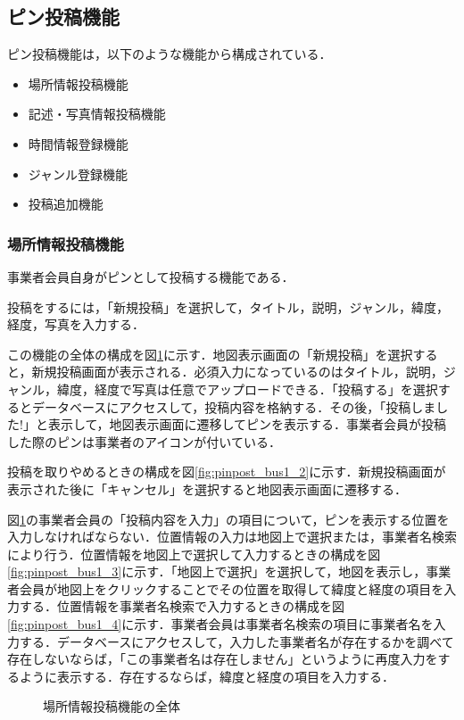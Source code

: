 \subsection{ピン投稿機能}
ピン投稿機能は，以下のような機能から構成されている．
\begin{itemize}
    \item 場所情報投稿機能
    \item 記述・写真情報投稿機能
    \item 時間情報登録機能
    \item ジャンル登録機能
    \item 投稿追加機能
\end{itemize}

\subsubsection{場所情報投稿機能}
事業者会員自身がピンとして投稿する機能である．

投稿をするには，「新規投稿」を選択して，タイトル，説明，ジャンル，緯度，経度，写真を入力する．

この機能の全体の構成を図\ref{fig:pinpost_bus1_1}に示す．地図表示画面の「新規投稿」を選択すると，新規投稿画面が表示される．必須入力になっているのはタイトル，説明，ジャンル，緯度，経度で写真は任意でアップロードできる．「投稿する」を選択するとデータベースにアクセスして，投稿内容を格納する．その後，「投稿しました!」と表示して，地図表示画面に遷移してピンを表示する．事業者会員が投稿した際のピンは事業者のアイコンが付いている．

投稿を取りやめるときの構成を図\ref{fig:pinpost_bus1_2}に示す．新規投稿画面が表示された後に「キャンセル」を選択すると地図表示画面に遷移する．

図\ref{fig:pinpost_bus1_1}の事業者会員の「投稿内容を入力」の項目について，ピンを表示する位置を入力しなければならない．位置情報の入力は地図上で選択または，事業者名検索により行う．位置情報を地図上で選択して入力するときの構成を図\ref{fig:pinpost_bus1_3}に示す．「地図上で選択」を選択して，地図を表示し，事業者会員が地図上をクリックすることでその位置を取得して緯度と経度の項目を入力する．位置情報を事業者名検索で入力するときの構成を図\ref{fig:pinpost_bus1_4}に示す．事業者会員は事業者名検索の項目に事業者名を入力する．データベースにアクセスして，入力した事業者名が存在するかを調べて存在しないならば，「この事業者名は存在しません」というように再度入力をするように表示する．存在するならば，緯度と経度の項目を入力する．

\begin{figure}[H]
    \centering
    
    \caption{場所情報投稿機能の全体}
    \label{fig:pinpost_bus1_1}
\end{figure}

